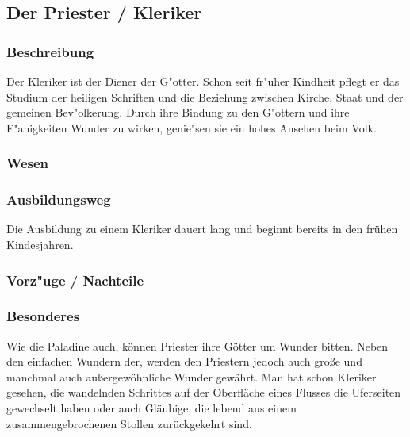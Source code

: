 \subsection{Der Priester / Kleriker}
\subsubsection{Beschreibung}
Der Kleriker ist der Diener der G"otter. Schon seit fr"uher Kindheit pflegt er das Studium der heiligen Schriften
 und die Beziehung zwischen Kirche, Staat und der gemeinen Bev"olkerung. Durch ihre Bindung zu den G"ottern und ihre 
 F"ahigkeiten Wunder zu wirken, genie"sen sie ein hohes Ansehen beim Volk.
\subsubsection{Wesen}
\subsubsection{Ausbildungsweg}
\par Die Ausbildung zu einem Kleriker dauert lang und beginnt bereits in den frühen Kindesjahren.
\subsubsection{Vorz"uge / Nachteile}
\subsubsection{Besonderes}
\par Wie die Paladine auch, können Priester ihre Götter um Wunder bitten. Neben den einfachen Wundern der,
werden den Priestern jedoch auch große und manchmal auch außergewöhnliche Wunder gewährt. Man hat schon Kleriker
gesehen, die wandelnden Schrittes auf der Oberfläche eines Flusses die Uferseiten gewechselt haben oder auch 
Gläubige, die lebend aus einem zusammengebrochenen Stollen zurückgekehrt sind.
